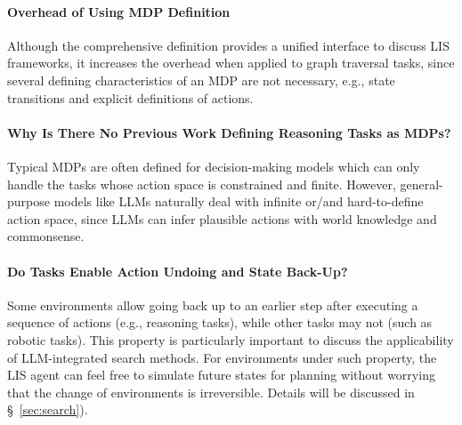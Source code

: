 \paragraph{Overhead of Using MDP Definition}
Although the comprehensive definition provides a unified interface to discuss LIS frameworks, it increases the overhead when applied to graph traversal tasks, since several defining characteristics of an MDP are not necessary, e.g., state transitions and explicit definitions of actions.

\paragraph{Why Is There No Previous Work Defining Reasoning Tasks as MDPs? }
Typical MDPs are often defined for decision-making models which can only handle the tasks whose action space is constrained and finite. However, general-purpose models like LLMs naturally deal with infinite or/and hard-to-define action space, since LLMs can infer plausible actions with world knowledge and commonsense. 

\paragraph{Do Tasks Enable Action Undoing and State Back-Up?}
Some environments allow going back up to an earlier step after executing a sequence of actions (e.g., reasoning tasks), while other tasks may not (such as robotic tasks). 
This property is particularly important to discuss the applicability of LLM-integrated search methods.
For environments under such property, the LIS agent can feel free to simulate future states for planning without worrying that the change of environments is irreversible.
Details will be discussed in \S~\ref{sec:search}). 

